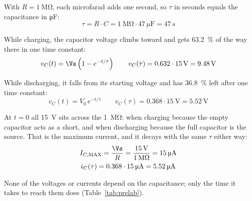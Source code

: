 \documentclass[offwhitecover]{lennylab}
\begin{document}
With $R = \qty{1}{\mega\ohm}$, each microfarad adds one second, so $\tau$ in seconds equals the capacitance in \unit{\micro\farad}:
\begin{equation}
  \tau = R \cdot C = \qty{1}{\mega\ohm} \cdot \qty{47}{\micro\farad} = \qty{47}{\second}
\end{equation}

While charging, the capacitor voltage climbs toward \Vs{} and gets \qty{63.2}{\percent} of the way there in one time constant:
\begin{equation}
  v_C(t) = \Vs\left(1 - e^{-t/\tau}\right) \qquad
  v_C(\tau) = 0.632 \cdot \qty{15}{\volt} = \qty{9.48}{\volt}
\end{equation}

While discharging, it falls from its starting voltage and has \qty{36.8}{\percent} left after one time constant:
\begin{equation}
  v_C(t) = V_0\,e^{-t/\tau} \qquad
  v_C(\tau) = 0.368 \cdot \qty{15}{\volt} = \qty{5.52}{\volt}
\end{equation}

At $t = 0$ all \qty{15}{\volt} sits across the \qty{1}{\mega\ohm}: when charging because the empty capacitor acts as a short, and when discharging because the full capacitor is the source. That is the maximum current, and it decays with the same $\tau$ either way:
\begin{gather}
  I_{C,\mathrm{MAX}} =\frac{\Vs}{R} = \frac{\qty{15}{\volt}}{\qty{1}{\mega\ohm}}
    = \qty{15}{\micro\ampere} \\
  i_C(\tau) = 0.368 \cdot \qty{15}{\micro\ampere} = \qty{5.52}{\micro\ampere}
\end{gather}

None of the voltages or currents depend on the capacitance; only the time it takes to reach them does (Table~\ref{tab:prelab}).
\end{document}
